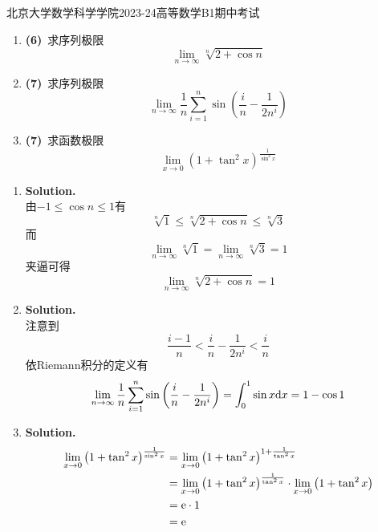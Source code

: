 \documentclass{ctexart}
\begin{document}
\pagestyle{empty}
\begin{center}\Large
    北京大学数学科学学院2023-24高等数学B1期中考试
\end{center}
\begin{problem}[1.(20\songti{分})]
    \begin{enumerate}[label=\textbf{(\arabic*)},leftmargin=*]
        \item \textbf{(6)}\ 求序列极限$$\lim_{n\to\infty}{\sqrt[n]{2+\cos n}}$$
        \item \textbf{(7)}\ 求序列极限$$\lim_{n\to\infty}{\dfrac{1}{n}\sum_{i=1}^{n}{\sin\left(\dfrac{i}{n}-\dfrac{1}{2n^i}\right)}}$$
        \item \textbf{(7)}\ 求函数极限$$\lim_{x\to0}{\left(1+\tan^2 x\right)^{\frac{1}{\sin^2 x}}}$$
    \end{enumerate}
\end{problem}
\begin{solution}[Solution.]
    \begin{enumerate}[label=\textbf{(\arabic*)},leftmargin=*]
        \item \textbf{Solution.}\\
            由$-1\leqslant \cos n\leqslant 1$有
            $$\sqrt[n]{1}\leqslant\sqrt[n]{2+\cos n}\leqslant\sqrt[n]{3}$$
            而$$\lim_{n\to\infty}{\sqrt[n]{1}}=\lim_{n\to\infty}{\sqrt[n]{3}}=1$$
            夹逼可得$$\lim_{n\to\infty}{\sqrt[n]{2+\cos n}}=1$$
        \item \textbf{Solution.}\\
            注意到$$\dfrac{i-1}{n}<\dfrac{i}{n}-\dfrac{1}{2n^i}<\dfrac{i}{n}$$
            依Riemann积分的定义有
            $$\lim_{n\to\infty}{\dfrac{1}{n}\sum_{i=1}^{n}{\sin\left(\dfrac{i}{n}-\dfrac{1}{2n^i}\right)}}=\int_0^1{\sin x\mathrm{d} x}=1-\cos1$$
        \item \textbf{Solution.}
            \begin{align*}
                \lim_{x\to0}{\left(1+\tan^2 x\right)^{\frac{1}{\sin^2 x}}}
                &= \lim_{x\to0}{\left(1+\tan^2 x\right)^{1+\frac{1}{\tan^2 x}}} \\
                &= \lim_{x\to0}{\left(1+\tan^2 x\right)^{\frac{1}{\tan^2 x}}}\cdot\lim_{x\to0}{\left(1+\tan^2 x\right)} \\
                &= \mathrm{e}\cdot 1 \\
                &= \mathrm{e}
            \end{align*}
    \end{enumerate}
\end{solution}
\end{document}

